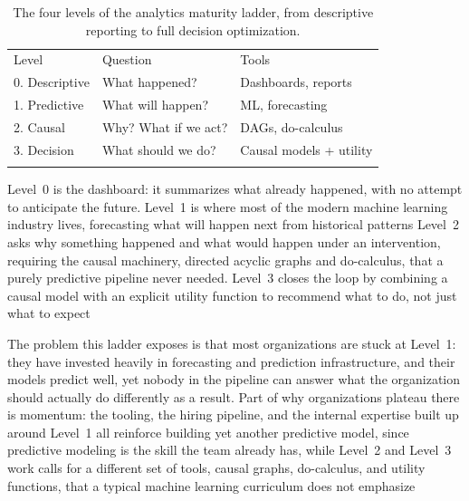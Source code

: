 \begin{table}[!t]
  \caption{The four levels of the analytics maturity ladder, from descriptive reporting
  to full decision optimization.}
  \label{tab:analytics-maturity-ladder}
  \begin{tabular}{p{2.3cm}p{4.1cm}p{4.9cm}}
    \hline
    \noalign{\smallskip} Level                                      & Question             & Tools                   \\
    \noalign{\smallskip}\svhline\noalign{\smallskip} 0. Descriptive & What happened?       & Dashboards, reports     \\
    1. Predictive                                                   & What will happen?    & ML, forecasting         \\
    2. Causal                                                       & Why? What if we act? & DAGs, do-calculus       \\
    3. Decision                                                     & What should we do?   & Causal models + utility \\
    \noalign{\smallskip}                                             \hline
    \noalign{\smallskip}
  \end{tabular}
\end{table}

Level~0 is the dashboard: it summarizes what already happened, with no attempt to
anticipate the future. Level~1 is where most of the modern machine learning
industry lives, forecasting what will happen next from historical patterns Level~2
asks why something happened and what would happen under an intervention,
requiring the causal machinery, directed acyclic graphs and do-calculus, that a
purely predictive pipeline never needed. Level~3 closes the loop by combining a causal
model with an explicit utility function to recommend what to do, not just what
to expect

The problem this ladder exposes is that most organizations are stuck at Level~1:
they have invested heavily in forecasting and prediction infrastructure, and their
models predict well, yet nobody in the pipeline can answer what the organization
should actually do differently as a result. Part of why organizations plateau there
is momentum: the tooling, the hiring pipeline, and the internal expertise built
up around Level~1 all reinforce building yet another predictive model, since predictive
modeling is the skill the team already has, while Level~2 and Level~3 work calls
for a different set of tools, causal graphs, do-calculus, and utility functions,
that a typical machine learning curriculum does not emphasize

